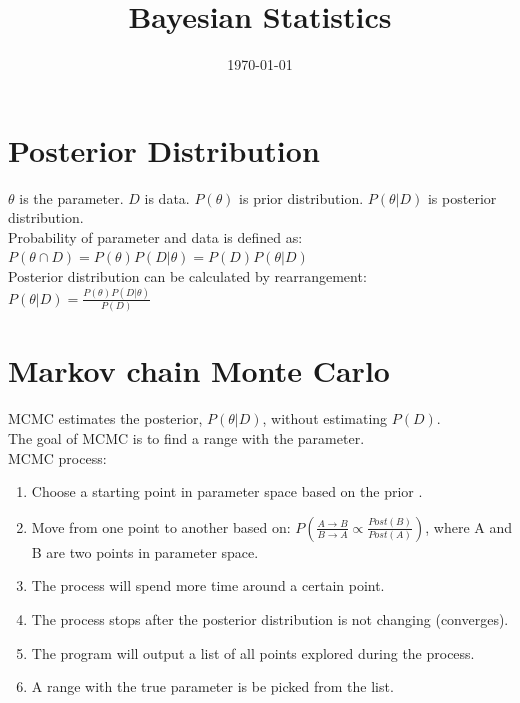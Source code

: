 \documentclass[12pt]{article}
\title{Bayesian Statistics}
\date{\today}
\begin{document}
\maketitle

\section{Posterior Distribution}
$\theta$ is the parameter. $D$ is data. $P(\theta)$ is prior distribution. $P(\theta|D)$ is posterior distribution.\\

Probability of parameter and data is defined as: $P(\theta \cap D) = P(\theta)P(D|\theta) = P(D)P(\theta|D)$ \\

Posterior distribution can be calculated by rearrangement: $P(\theta|D) = \frac{P(\theta)P(D|\theta)}{P(D)}$ \\

\section{Markov chain Monte Carlo}
MCMC estimates the posterior, $P(\theta|D)$, without estimating $P(D)$. \\

The goal of MCMC is to find a range with the parameter. \\

MCMC process:
\begin{enumerate}
    \item Choose a starting point in parameter space based on the prior .
    \item Move from one point to another based on: $P(\frac{A \rightarrow B}{B \rightarrow A} \propto \frac{Post(B)}{Post(A)})$, where A and B are two points in parameter space.
    \item The process will spend more time around a certain point.
    \item The process stops after the posterior distribution is not changing (converges).
    \item The program will output a list of all points explored during the process.
    \item A range with the true parameter is be picked from the list.
\end{enumerate}
\end{document}
